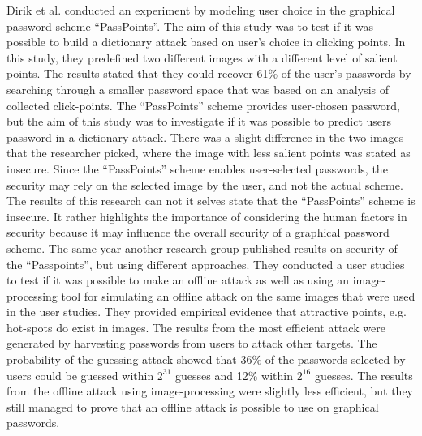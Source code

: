   Dirik et al. \cite{Dirik} conducted an experiment by modeling user choice in the graphical password scheme ``PassPoints''. The aim of this study was to test if it was possible to build a dictionary attack based on user's choice in clicking points. In this study, they predefined two different images with a different level of salient points. The results stated that they could recover 61\% of the user's passwords by searching through a smaller password space that was based on an analysis of collected click-points. The ``PassPoints'' scheme provides user-chosen password, but the aim of this study was to investigate if it was possible to predict users password in a dictionary attack. There was a slight difference in the two images that the researcher picked, where the image with less salient points was stated as insecure. Since the ``PassPoints'' scheme enables user-selected passwords, the security may rely on the selected image by the user, and not the actual scheme. The results of this research can not it selves state that the ``PassPoints'' scheme is insecure. It rather highlights the importance of considering the human factors in security because it may influence the overall security of a graphical password scheme. The same year another research group published \cite{Thorpe2} results on security of the ``Passpoints'', but using different approaches. They conducted a user studies to test if it was possible to make an offline attack as well as using an image-processing tool for simulating an offline attack on the same images that were used in the user studies. They provided empirical evidence that attractive points, e.g. hot-spots do exist in images. The results from the most efficient attack were generated by harvesting passwords from users to attack other targets. The probability of the guessing attack showed that 36\% of the passwords selected by users could be guessed within $2^{31}$ guesses and 12\% within $2^{16}$ guesses. The results from the offline attack using image-processing were slightly less efficient, but they still managed to prove that an offline attack is possible to use on graphical passwords.   

